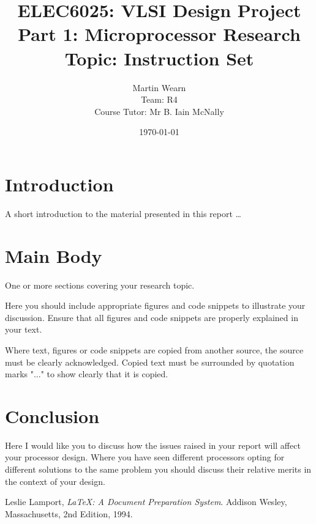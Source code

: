\documentclass[12pt,a4paper]{article}
\title{ELEC6025: VLSI Design Project \\Part 1: Microprocessor Research\\Topic: Instruction Set}
\author{Martin Wearn\\ Team: R4\\Course Tutor: Mr B. Iain McNally}
\date{\today}
\begin{document}
\begin{titlepage}
\maketitle
\end{titlepage}

\tableofcontents
\clearpage

\section{Introduction}
A short introduction to the material presented in this report \dots\citep{greenwade93}

\section{Main Body}
One or more sections covering your research topic.

Here you should include appropriate figures and code snippets to illustrate your discussion. Ensure that all figures and code snippets are properly explained in your text.

Where text, figures or code snippets are copied from another source, the source must be clearly acknowledged. Copied text must be surrounded by quotation marks "..." to show clearly that it is copied. 

\section{Conclusion}
Here I would like you to discuss how the issues raised in your report will affect your processor design. Where you have seen different processors opting for different solutions to the same problem you should discuss their relative merits in the context of your design. 



\renewcommand{\refname}{Bibliography}
\begin{thebibliography}{9}

  Leslie Lamport,
  \emph{\LaTeX: A Document Preparation System}.
  Addison Wesley, Massachusetts,
  2nd Edition,
  1994.

\end{thebibliography}
\end{document}
